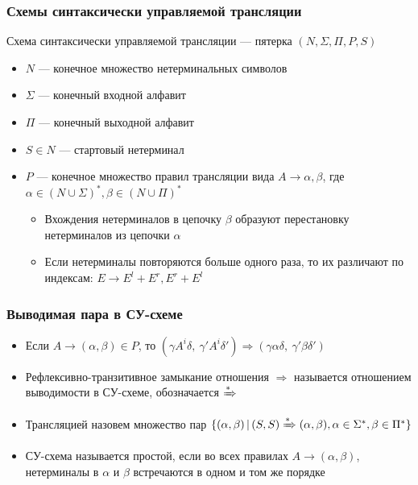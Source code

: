 \documentclass{beamer}
\newcommand{\derive}[0]{\xRightarrow[]{*}}
\begin{document}
\begin{frame}[fragile]
  \transwipe[direction=90]
  \frametitle{Схемы синтаксически управляемой трансляции}

\begin{center}
    Схема синтаксически управляемой трансляции --- пятерка $(N, \Sigma, \Pi, P, S)$ 
\end{center} 

  \begin{itemize}
    \item $N$ --- конечное множество нетерминальных символов
    \item $\Sigma$ --- конечный входной алфавит 
    \item $\Pi$ --- конечный выходной алфавит
    \item $S \in N$ --- стартовый нетерминал
    \item $P$ --- конечное множество правил трансляции вида $A \rightarrow \alpha, \beta$, где $\alpha \in (N \cup \Sigma)^*, \beta \in (N \cup \Pi)^*$
    \begin{itemize}
      \item Вхождения нетерминалов в цепочку $\beta$ образуют перестановку нетерминалов из цепочки $\alpha$
      \item Если нетерминалы повторяются больше одного раза, то их различают по индексам: $E \rightarrow E^l + E^r, E^r + E^l$
    \end{itemize}
  \end{itemize}
\end{frame}

\begin{frame}[fragile]
  \transwipe[direction=90]
  \frametitle{Выводимая пара в СУ-схеме}
  \begin{itemize}
    \item Если $A \rightarrow (\alpha, \beta) \in P$, то $(\gamma A^i \delta, \ \gamma' A^i \delta') \Rightarrow (\gamma \alpha \delta, \ \gamma' \beta \delta')$
    \item Рефлексивно-транзитивное замыкание отношения $\Rightarrow$ называется отношением выводимости в СУ-схеме, обозначается $\xRightarrow[]{*}$
    \item Трансляцией назовем множество пар $\{ (\alpha, \beta) \, | \, (S, S) \derive (\alpha, \beta), \alpha \in \Sigma^*, \beta \in \Pi^* \}$
    \item СУ-схема называется простой, если во всех правилах $A \rightarrow (\alpha, \beta)$, нетерминалы в $\alpha$ и $\beta$ встречаются в одном и том же порядке
  \end{itemize}
\end{frame}
\end{document}
